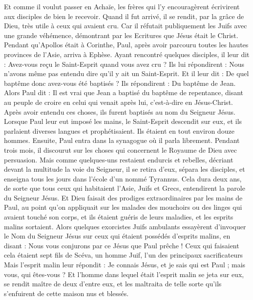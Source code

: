 \begin{multicols}{2}
{{Et comme il voulut passer en Achaïe, les frères qui l'y encouragèrent écrivirent aux disciples de bien le recevoir. Quand il fut arrivé, il se rendit, par la grâce de Dieu, très utile à ceux qui avaient cru.
Car il réfutait publiquement les Juifs avec une grande véhémence, démontrant par les Ecritures que Jésus était le Christ.
\VerseOne{}Pendant qu'Apollos était à Corinthe, Paul, après avoir parcouru toutes les hautes provinces de l'Asie, arriva à Ephèse. Ayant rencontré quelques disciples, il leur dit :
Avez-vous reçu le Saint-Esprit quand vous avez cru ? Ils lui répondirent : Nous n'avons même pas entendu dire qu'il y ait un Saint-Esprit.
Et il leur dit : De quel baptême donc avez-vous été baptisés ? Ils répondirent : Du baptême de Jean.
Alors Paul dit : Il est vrai que Jean a baptisé du baptême de repentance, disant au peuple de croire en celui qui venait après lui, c'est-à-dire en Jésus-Christ.
Après avoir entendu ces choses, ils furent baptisés au nom du Seigneur Jésus.
Lorsque Paul leur eut imposé les mains, le Saint-Esprit descendit sur eux, et ils parlaient diverses langues et prophétisaient.
Ils étaient en tout environ douze hommes.
Ensuite, Paul entra dans la synagogue où il parla librement. Pendant trois mois, il discourut sur les choses qui concernent le Royaume de Dieu avec persuasion.
Mais comme quelques-uns restaient endurcis et rebelles, décriant devant la multitude la voie du Seigneur, il se retira d'eux, sépara les disciples, et enseigna tous les jours dans l'école d'un nommé Tyrannus.
Cela dura deux ans, de sorte que tous ceux qui habitaient l'Asie, Juifs et Grecs, entendirent la parole du Seigneur Jésus.
Et Dieu faisait des prodiges extraordinaires par les mains de Paul,
au point qu'on appliquait sur les malades des mouchoirs ou des linges qui avaient touché son corps, et ils étaient guéris de leurs maladies, et les esprits malins sortaient.
Alors quelques exorcistes Juifs ambulants essayèrent d'invoquer le Nom du Seigneur Jésus sur ceux qui étaient possédés d'esprits malins, en disant : Nous vous conjurons par ce Jésus que Paul prêche !
Ceux qui faisaient cela étaient sept fils de Scéva, un homme Juif, l'un des principaux sacrificateurs
Mais l'esprit malin leur répondit : Je connais Jésus, et je sais qui est Paul ; mais vous, qui êtes-vous ?
Et l'homme dans lequel était l'esprit malin se jeta sur eux, se rendit maître de deux d'entre eux, et les maltraita de telle sorte qu'ils s'enfuirent de cette maison nus et blessés.
}}
\end{multicols}
